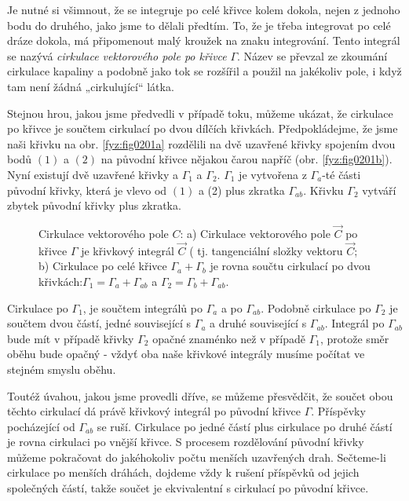       Je nutné si všimnout, že se integruje po celé křivce kolem dokola, nejen z jednoho bodu do 
      druhého, jako jsme to dělali předtím. To, že je třeba integrovat po celé dráze dokola, má 
      připomenout malý kroužek na znaku integrování. Tento integrál se nazývá \emph{cirkulace 
      vektorového pole po křivce} \(\Gamma\). Název se převzal ze zkoumání cirkulace kapaliny a 
      podobně jako tok se rozšířil a použil na jakékoliv pole, i když tam není žádná „cirkulující“ 
      látka.
      
      Stejnou hrou, jakou jsme předvedli v případě toku, můžeme ukázat, že cirkulace po křivce je 
      součtem cirkulací po dvou dílčích křivkách. Předpokládejme, že jsme naši křivku na obr. 
      \ref{fyz:fig0201a} rozdělili na dvě uzavřené křivky spojením dvou bodů \((1)\) a \((2)\) na 
      původní křivce nějakou čarou napříč (obr. \ref{fyz:fig0201b}). Nyní existují dvě uzavřené 
      křivky  a \(\Gamma_1\) a \(\Gamma_2\). \(\Gamma_1\) je vytvořena z \(\Gamma_a\)-té části 
      původní křivky, která je vlevo od \((1)\) a (2) plus zkratka \(\Gamma_{ab}\). Křivku 
      \(\Gamma_2\) vytváří zbytek původní křivky plus zkratka.
      
      \begin{figure}[ht!]
        \centering
        \caption{Cirkulace vektorového pole \(C\): a) Cirkulace vektorového pole \(\vec{C}\) po 
                  křivce \(\Gamma\) je křivkový integrál \(\vec{C}\) ( tj. tangenciální složky vektoru 
                  \(\vec{C}\); b) Cirkulace po celé křivce \(\Gamma_a+\Gamma_b\) je rovna součtu 
                  cirkulací po dvou křivkách:\(\Gamma_1=\Gamma_a+\Gamma_{ab}\) a \(\Gamma_2=\Gamma_b
                  +\Gamma_{ab}\).}
        \label{fyz:fig0201}
      \end{figure} 
    
      Cirkulace po \(\Gamma_1\), je součtem integrálů po \(\Gamma_a\) a po \(\Gamma_{ab}\). Podobně 
      cirkulace po \(\Gamma_2\) je součtem dvou částí, jedné související s \(\Gamma_a\) a druhé 
      související s \(\Gamma_{ab}\). Integrál po \(\Gamma_{ab}\) bude mít v případě křivky 
      \(\Gamma_2\) opačné znaménko než v případě \(\Gamma_1\), protože směr oběhu bude opačný - vždyť 
      oba naše křivkové integrály musíme počítat ve stejném smyslu oběhu.
          
      Toutéž úvahou, jakou jsme provedli dříve, se můžeme přesvědčit, že součet obou těchto cirkulací
      dá právě křivkový integrál po původní křivce \(\Gamma\). Příspěvky pocházející od 
      \(\Gamma_{ab}\) se ruší. Cirkulace po jedné částí plus cirkulace po druhé částí je rovna 
      cirkulaci po vnější křivce. S procesem rozdělování původní křivky můžeme pokračovat do 
      jakéhokoliv počtu menších uzavřených drah. Sečteme-li cirkulace po menších dráhách, dojdeme 
      vždy k rušení příspěvků od jejich společných částí, takže součet je ekvivalentní s cirkulací po 
      původní křivce.       
  
